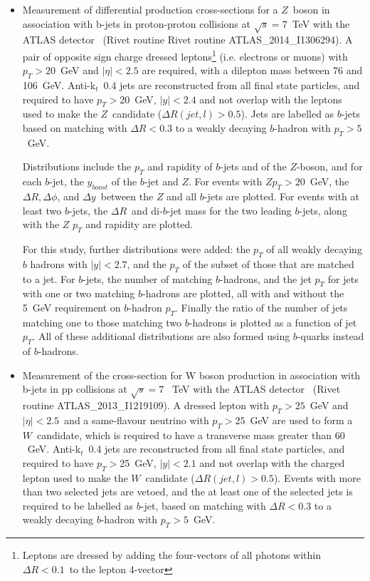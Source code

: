\documentclass[11pt]{cernrep} \usepackage{graphicx,epsfig} 
\newcommand{\pt}{\ensuremath{p_{T}}\xspace}
\begin{document}
\begin{itemize}
\item Measurement of differential production cross-sections for a $Z$\ boson in association with b-jets in proton-proton collisions at $\sqrt{s} = 7$~TeV with the ATLAS detector~\cite{Aad:2014dvb} (Rivet routine Rivet routine ATLAS\_2014\_I1306294). A pair of opposite sign charge dressed leptons\footnote{Leptons are dressed by adding the four-vectors of all photons within $\Delta R<0.1$\ to the lepton 4-vector} (i.e. electrons or muons) with $\pt>20$~GeV and $|\eta|<2.5$ are required, with a dilepton mass between 76 and 106~GeV. Anti-k$_{t}$\ 0.4 jets are reconstructed from all final state particles, and required to have $\pt>$20~GeV, $|y|<2.4$ and not overlap with the leptons used to make the $Z$~candidate ($\Delta R(jet, l)> 0.5$). Jets are labelled as $b$-jets based on matching with $\Delta  R<0.3$ to a weakly decaying $b$-hadron with $\pt>5$~GeV.

  Distributions include the \pt and rapidity of $b$-jets and of the $Z$-boson, and for each $b$-jet, the $y_{boost}$ of the $b$-jet and $Z$. For events with $Z \pt>20$~GeV, the $\Delta R, \Delta\phi$, and $\Delta y$\ between the $Z$ and all $b$-jets are plotted. For events with at least two $b$-jets, the $\Delta R$\ and di-$b$-jet mass for the two leading $b$-jets, along with the $Z$ \pt and rapidity are plotted.

  For this study, further distributions were added: the \pt of all weakly decaying $b$ hadrons with $|y|<2.7$, and the \pt of the subset of those that are matched to a jet. For $b$-jets, the number of matching $b$-hadrons, and the jet \pt for jets with one or two matching $b$-hadrons are plotted, all  with and without the 5~GeV requirement on $b$-hadron \pt. Finally the ratio of the number of jets matching one to those matching two $b$-hadrons is plotted as a function of jet \pt. All of these additional distributions are also formed using $b$-quarks instead of $b$-hadrons. 
  
\item Measurement of the cross-section for W boson production in association with b-jets in pp collisions at $\sqrt{s} = 7$~ TeV with the ATLAS detector~\cite{Aad:2013vka} (Rivet routine ATLAS\_2013\_I1219109). A dressed lepton with $\pt>25$~GeV and $|\eta|<2.5$\ and a same-flavour neutrino with $\pt>25$~GeV are used to form a $W$~candidate, which is required to have a transverse mass greater than $60$~GeV. Anti-k$_{t}$\ 0.4 jets are reconstructed from all final state particles, and required to have $\pt>$25~GeV, $|y|<2.1$ and not overlap with the charged lepton used to make the $W$~candidate ($\Delta R(jet, l)> 0.5$). Events with more than two selected jets are vetoed, and the at least one of the selected jets is required to be labelled as $b$-jet, based on matching with $\Delta  R<0.3$ to a weakly decaying $b$-hadron with $\pt>5$~GeV.


\end{itemize}
\end{document}
